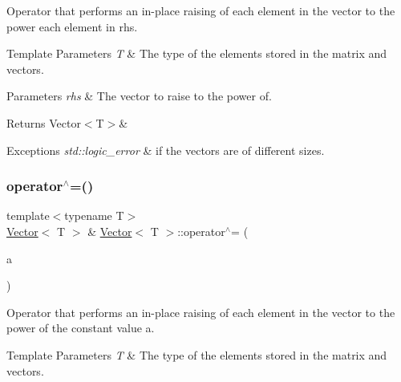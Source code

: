 Operator that performs an in-\/place raising of each element in the vector to the power each element in {\ttfamily rhs}. 


\begin{DoxyTemplParams}{Template Parameters}
{\em T} & The type of the elements stored in the matrix and vectors. \\
\hline
\end{DoxyTemplParams}

\begin{DoxyParams}{Parameters}
{\em rhs} & The vector to raise to the power of. \\
\hline
\end{DoxyParams}
\begin{DoxyReturn}{Returns}
Vector$<$\+T$>$\&
\end{DoxyReturn}

\begin{DoxyExceptions}{Exceptions}
{\em std\+::logic\+\_\+error} & if the vectors are of different sizes. \\
\hline
\end{DoxyExceptions}
\mbox{\label{classVector_a6767000b5cbf4999aa301eb24a7b74fc}} 
\subsubsection{\texorpdfstring{operator$^\wedge$=()}{operator^=()}\hspace{0.1cm}{\footnotesize\ttfamily [2/2]}}
{\footnotesize\ttfamily template$<$typename T$>$ \\
\mbox{\hyperlink{classVector}{Vector}}$<$ T $>$ \& \mbox{\hyperlink{classVector}{Vector}}$<$ T $>$\+::operator$^\wedge$= (\begin{DoxyParamCaption}\item[{const T \&}]{a }\end{DoxyParamCaption})\hspace{0.3cm}{\ttfamily [inline]}}



Operator that performs an in-\/place raising of each element in the vector to the power of the constant value {\ttfamily a}. 


\begin{DoxyTemplParams}{Template Parameters}
{\em T} & The type of the elements stored in the matrix and vectors. \\
\hline
\end{DoxyTemplParams}

